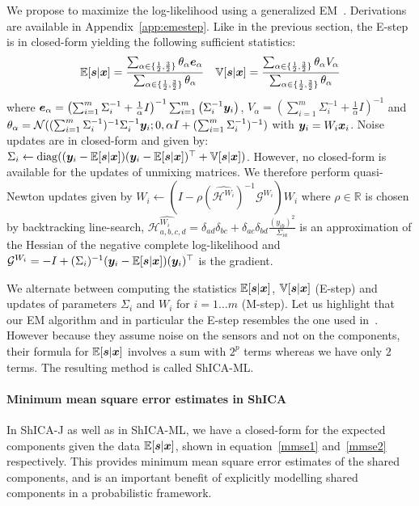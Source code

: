 We propose to maximize the log-likelihood using a generalized
EM~\cite{neal1998view, dempster1977maximum}. Derivations are available in Appendix~\ref{app:emestep}. Like in the previous section, the E-step is in closed-form yielding the following sufficient statistics:
\begin{align}
\label{mmse2}
\mathbb{E}[\boldsymbol{s} | \boldsymbol{x}] = \frac{\sum_{\alpha \in \{\frac12, \frac32
    \}}\theta_{\alpha} \boldsymbol{e}_{\alpha}}{\sum_{\alpha \in
    \{\frac12, \frac32 \}}\theta_{\alpha}}
    && 
    \mathbb{V}[\boldsymbol{s} | \boldsymbol{x}] = \frac{\sum_{\alpha \in \{\frac12, \frac32
    \}}\theta_{\alpha} V_{\alpha}}{\sum_{\alpha \in
    \{\frac12, \frac32 \}}\theta_{\alpha}} 
\end{align}
    where
    $\boldsymbol{e}_{\alpha}= \left(\sum_{i=1}^m \Sigma_i^{-1}  + \frac1{\alpha}I \right)^{-1}  \sum_{i=1}^m \left(\Sigma_i^{-1} \boldsymbol{y}_i \right)$,  $V_{\alpha} = (\sum_{i=1}^m \Sigma_i^{-1}  + \frac1{\alpha}I)^{-1}$ and $\theta_{\alpha} = \mathcal{N}((\sum_{i=1}^m \Sigma_i^{-1})^{-1} \Sigma_i^{-1} \boldsymbol{y}_i; 0, \alpha I + (\sum_{i=1}^m \Sigma_i^{-1})^{-1})$ with $\boldsymbol{y}_i = W_i \boldsymbol{x}_i$.
Noise updates are in closed-form and given by:
$\Sigma_i \leftarrow  \operatorname*{diag}((\boldsymbol{y}_i - \mathbb{E}[\boldsymbol{s} | \boldsymbol{x}]) (\boldsymbol{y}_i - \mathbb{E}[\boldsymbol{s} | \boldsymbol{x}])^{\top}+ \mathbb{V}[\boldsymbol{s} | \boldsymbol{x}])$.
However, no closed-form is available for the updates of unmixing matrices. We therefore perform quasi-Newton updates given by
$W_i \leftarrow (I - \rho (\widehat{\mathcal{H}^{W_i}})^{-1} \mathcal{G}^{W_i}) W_i$ where $\rho \in \mathbb{R}$ is chosen by backtracking line-search, 
$\widehat{\mathcal{H}^{W_i}_{a, b, c, d}} =  \delta_{ad} \delta_{bc} + \delta_{ac} \delta_{bd}\frac{(y_{ib})^2}{\Sigma_{ia}}$ is an approximation of the Hessian of the negative complete log-likelihood and $\mathcal{G}^{W_i} = -I + (\Sigma_i)^{-1}(\boldsymbol{y}_i - \mathbb{E}[\boldsymbol{s}|\boldsymbol{x}])(\boldsymbol{y}_i)^{\top}$ is the gradient.

We alternate between computing the statistics $\mathbb{E}[\boldsymbol{s}|\boldsymbol{x}]$, 
$\mathbb{V}[\boldsymbol{s}|\boldsymbol{x}]$ (E-step) and updates of parameters $\Sigma_i$ and $W_i$ for $i=1 \dots m$ (M-step). Let us highlight that our EM algorithm and in particular the E-step resembles the one used in~\cite{moulines1997maximum}. However because they assume noise on the sensors and not on the components, their formula for $\mathbb{E}[\boldsymbol{s}| \boldsymbol{x}]$ involves a sum with $2^p$ terms whereas we have only $2$ terms. The resulting method is called ShICA-ML.

\paragraph{Minimum mean square error estimates in ShICA}
In ShICA-J as well as in ShICA-ML, we have a closed-form for the expected components given the data $\mathbb{E}[\boldsymbol{s} | \boldsymbol{x}]$, shown in equation~\eqref{mmse1} and~\eqref{mmse2} respectively. This provides minimum mean square error estimates of the shared components, and is an important benefit of explicitly modelling shared components in a probabilistic framework.

